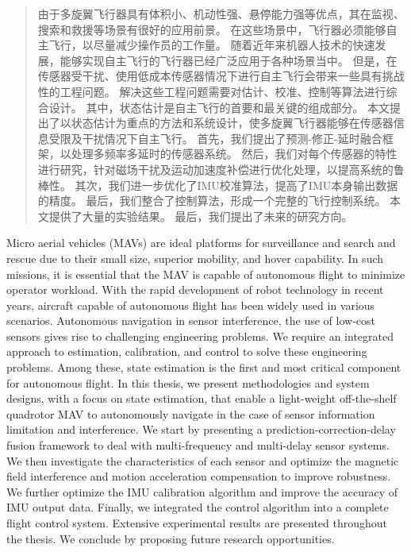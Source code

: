 \documentclass[
  type=master
]{gdutthesis}
\begin{document}
\begin{abstract}
  由于多旋翼飞行器具有体积小、机动性强、悬停能力强等优点，其在监视、搜索和救援等场景有很好的应用前景。
  在这些场景中，飞行器必须能够自主飞行，以尽量减少操作员的工作量。
  随着近年来机器人技术的快速发展，能够实现自主飞行的飞行器已经广泛应用于各种场景当中。
  但是，在传感器受干扰、使用低成本传感器情况下进行自主飞行会带来一些具有挑战性的工程问题。
  解决这些工程问题需要对估计、校准、控制等算法进行综合设计。
  其中，状态估计是自主飞行的首要和最关键的组成部分。
  本文提出了以状态估计为重点的方法和系统设计，使多旋翼飞行器能够在传感器信息受限及干扰情况下自主飞行。
  首先，我们提出了预测-修正-延时融合框架，以处理多频率多延时的传感器系统。
  然后，我们对每个传感器的特性进行研究，针对磁场干扰及运动加速度补偿进行优化处理，以提高系统的鲁棒性。
  其次，我们进一步优化了IMU校准算法，提高了IMU本身输出数据的精度。
  最后，我们整合了控制算法，形成一个完整的飞行控制系统。
  本文提供了大量的实验结果。
  最后，我们提出了未来的研究方向。
\end{abstract}

\begin{abstract*}
  Micro aerial vehicles (MAVs) are ideal platforms for surveillance and search and rescue due to their small size, superior mobility, and hover capability.
  In such missions, it is essential that the MAV is capable of autonomous flight to minimize operator workload.
  With the rapid development of robot technology in recent years, aircraft capable of autonomous flight has been widely used in various scenarios.
  Autonomous navigation in sensor interference, the use of low-cost sensors gives rise to challenging engineering
  problems.
  We require an integrated approach to estimation, calibration, and control to solve these engineering problems.
  Among these, state estimation is the first and most critical component for autonomous flight.   
  In this thesis, we present methodologies and system designs, with a focus on state estimation, that enable a light-weight off-the-shelf quadrotor MAV to autonomously navigate in the case of sensor information limitation and interference.
  We start by presenting a prediction-correction-delay fusion framework to deal with multi-frequency and multi-delay sensor systems.
  We then investigate the characteristics of each sensor and optimize the magnetic field interference and motion acceleration compensation to improve robustness.
  We further optimize the IMU calibration algorithm and improve the accuracy of IMU output data.
  Finally, we integrated the control algorithm into a complete flight control system.  	
  Extensive experimental results are presented throughout the thesis. 
  We conclude by proposing future research opportunities.
\end{abstract*}
\end{document}
